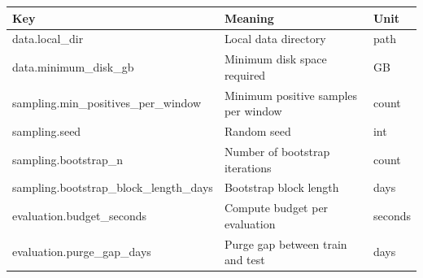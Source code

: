 \begin{tabular}{lll}
\toprule
Key & Meaning & Unit \\
\midrule
data.local_dir & Local data directory & path \\
data.minimum_disk_gb & Minimum disk space required & GB \\
sampling.min_positives_per_window & Minimum positive samples per window & count \\
sampling.seed & Random seed & int \\
sampling.bootstrap_n & Number of bootstrap iterations & count \\
sampling.bootstrap_block_length_days & Bootstrap block length & days \\
evaluation.budget_seconds & Compute budget per evaluation & seconds \\
evaluation.purge_gap_days & Purge gap between train and test & days \\
\bottomrule
\end{tabular}

